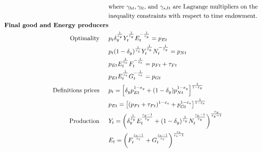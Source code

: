 \begin{align}
& \text{where $\gamma_{ht}, \gamma_{lt}$, and $\gamma_{sJt}$ are Lagrange multipliers on the }\nonumber \\ 
& \text{inequality constraints with respect to time endowment.}\nonumber \\ 
\text{\textbf{Final good and Energy producers}}&\nonumber\\
\text{Optimality}\ \hspace{4mm}&
 p_{t}\delta_y^\frac{1}{\varepsilon_y}Y_t^\frac{1}{\varepsilon_y}E_t^{-\frac{1}{\varepsilon_y}}=p_{Et}\nonumber\\
& p_{t}(1-\delta_y)^\frac{1}{\varepsilon_y}Y_t^\frac{1}{\varepsilon_y}N_t^{-\frac{1}{\varepsilon_y}}=p_{Nt}\nonumber\\
&
p_{Et}E_t^\frac{1}{\varepsilon_e}{F}_t^{-\frac{1}{\varepsilon_e}}=p_{{F}t}+\tau_{Ft}\nonumber\\
& p_{Et}E_t^\frac{1}{\varepsilon_e}G_t^{-\frac{1}{\varepsilon_e}}=p_{Gt}\nonumber\\
\text{Definitions prices}\ \hspace{4mm}&
p_{t}= \left[\delta_yp_{Et}^{1-\varepsilon_y}+(1-\delta_y)p_{Nt}^{1-\varepsilon_y}\right]^\frac{1}{1-\varepsilon_y}\nonumber\\
& p_{Et}= \left[(p_{{F}t}+\tau_{Ft})^{1-\varepsilon_e}+p_{Gt}^{1-\varepsilon_e}\right]^\frac{1}{1-\varepsilon_e}\nonumber\\
\text{Production}\ \hspace{4mm}& 
Y_t=\left(\delta_y^\frac{1}{\varepsilon_y}E_t^\frac{\varepsilon_y-1}{\varepsilon_y}+(1-\delta_y)^\frac{1}{\varepsilon_y}N_t^\frac{\varepsilon_y-1}{\varepsilon_y}\right)^\frac{\varepsilon_y}{\varepsilon_y-1}\nonumber\\
&E_t=\left({F}_t^\frac{\varepsilon_e-1}{\varepsilon_e}+G_t^\frac{\varepsilon_e-1}{\varepsilon_e}\right)^\frac{\varepsilon_e}{\varepsilon_e-1}\nonumber\\

\end{align}
